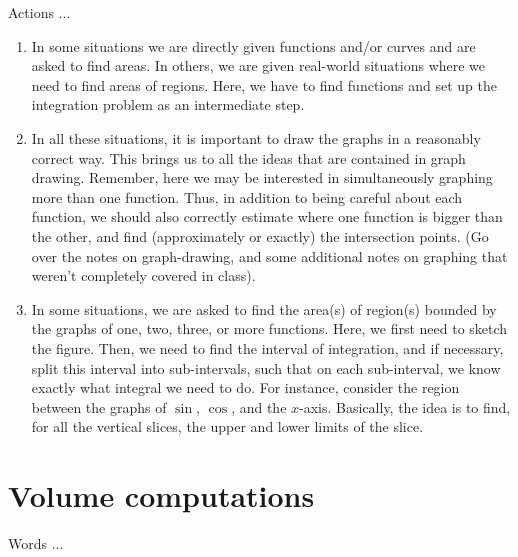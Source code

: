 \documentclass[10pt]{amsart}
\begin{document}
Actions ...

\begin{enumerate}
\item In some situations we are directly given functions and/or curves
  and are asked to find areas. In others, we are given real-world
  situations where we need to find areas of regions. Here, we have to
  find functions and set up the integration problem as an intermediate
  step.
\item In all these situations, it is important to draw the graphs in a
  reasonably correct way. This brings us to all the ideas that are
  contained in graph drawing. Remember, here we may be interested in
  simultaneously graphing more than one function. Thus, in addition to
  being careful about each function, we should also correctly estimate
  where one function is bigger than the other, and find (approximately
  or exactly) the intersection points. (Go over the notes on
  graph-drawing, and some additional notes on graphing that weren't
  completely covered in class).
\item In some situations, we are asked to find the area(s) of
  region(s) bounded by the graphs of one, two, three, or more
  functions. Here, we first need to sketch the figure. Then, we need
  to find the interval of integration, and if necessary, split this
  interval into sub-intervals, such that on each sub-interval, we know
  exactly what integral we need to do. For instance, consider the
  region between the graphs of $\sin$, $\cos$, and the
  $x$-axis. Basically, the idea is to find, for all the vertical
  slices, the upper and lower limits of the slice.
\end{enumerate}

\section{Volume computations}
Words ...
\end{document}
